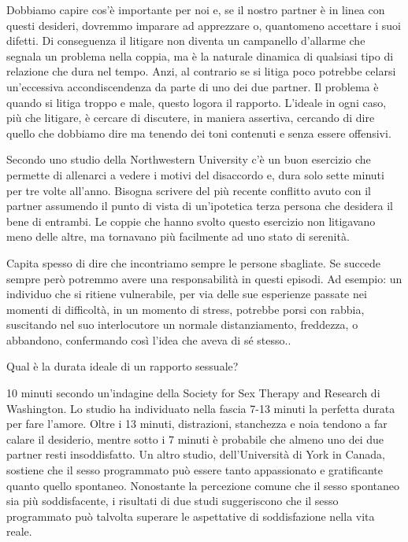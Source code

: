 \documentclass[12pt]{book} %
\begin{document}
Dobbiamo capire cos'è importante per noi e, se il nostro partner è in linea con questi desideri, dovremmo imparare ad apprezzare o, quantomeno accettare i suoi
difetti. Di conseguenza il litigare non diventa un campanello d'allarme che segnala un problema
nella coppia, ma è la naturale dinamica di qualsiasi tipo di relazione che dura nel tempo. Anzi, al contrario se si
litiga poco potrebbe celarsi un'eccessiva accondiscendenza da parte di uno dei due partner. Il
problema è quando si litiga troppo e male, questo logora il rapporto.
L'ideale in ogni caso, più che litigare, è cercare di discutere, in maniera assertiva, cercando di dire quello che dobbiamo dire ma tenendo dei toni contenuti e senza essere offensivi.

Secondo uno studio della Northwestern University c'è un buon esercizio che permette di allenarci a vedere i motivi del
disaccordo e, dura solo sette minuti per tre volte all'anno. Bisogna scrivere del più recente
conflitto avuto con il partner assumendo il punto di vista di un'ipotetica terza persona che desidera il bene di
entrambi. Le coppie che hanno svolto questo esercizio non litigavano meno delle altre, ma tornavano più facilmente ad
uno stato di serenità.

Capita spesso di dire che incontriamo sempre le persone sbagliate. Se succede sempre però potremmo avere una responsabilità in questi episodi. 
Ad esempio: un individuo che si ritiene vulnerabile, per via delle sue esperienze passate nei
momenti di difficoltà, in un momento di stress, potrebbe porsi con rabbia, suscitando nel suo interlocutore un normale
distanziamento, freddezza, o abbandono, confermando così l'idea che aveva di sé stesso..

\begin{mdframed}[linewidth=1pt]
Qual è la durata ideale di un rapporto sessuale?

10 minuti secondo un'indagine della Society for Sex Therapy and Research di Washington. Lo studio ha individuato nella
fascia 7-13 minuti la perfetta durata per fare l'amore. Oltre i 13 minuti, distrazioni, stanchezza e noia tendono a far
calare il desiderio, mentre sotto i 7 minuti è probabile che almeno uno dei due partner resti insoddisfatto.
Un altro studio, dell’Università di York in Canada, sostiene che il sesso programmato può essere tanto appassionato e gratificante quanto quello spontaneo. Nonostante la percezione comune che il sesso spontaneo sia più soddisfacente, i risultati di due studi suggeriscono che il sesso programmato può talvolta superare le aspettative di soddisfazione nella vita reale.
\end{mdframed}
\end{document}
